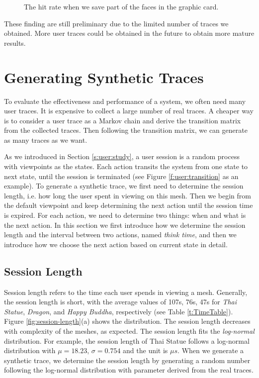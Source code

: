 \begin{figure}[htdp!]
    \centering
\caption{The hit rate when we save part of the faces in the graphic card.\label{fig:face_hit_rate}}
\end{figure}

These finding are still preliminary due to the limited number of traces we obtained. More user traces
could be obtained in the future to obtain more mature results.

\section{Generating Synthetic Traces}
\label{s:user:synthetic}
To evaluate the effectiveness and performance of a system, we often need many user traces. 
It is expensive to collect a large number of real traces. 
A cheaper way is to consider a user trace as a Markov chain
and derive the transition matrix from the collected traces.
Then following the transition matrix, we can generate as many traces as we want.

As we introduced in Section \ref{s:user:study}, a user session is a random process 
with viewpoints as the states. Each action transits
the system from one state to next state, until the session is terminated
(see Figure \ref{f:user:transition} as an example). 
To generate a synthetic trace, we first need to determine the session length, i.e. how long
the user spent in viewing on this mesh. Then we begin from the default viewpoint and keep
determining the next action until the session time is expired. For each action, we need 
to determine two things: when and what is the next action. In this section we first introduce
how we determine the session length and the interval between two actions, named \emph{think time},
and then we introduce how we choose the next action based on current state in detail.

\subsection{Session Length}
\label{ss:user:session}
Session length refers to the time each user spends in viewing a mesh. 
Generally, the session length is short, with the average values of 107s, 76s, 47s for \textit{Thai Statue}, 
\textit{Dragon}, and \textit{Happy Buddha}, respectively (see Table \ref{t:TimeTable}). 
Figure \ref{fig:session-length}(a) shows the distribution. 
The session length decreases with complexity of the meshes, as expected. 
The session length fits the \textit{log-normal} distribution.
For example, the session length of Thai Statue follows a log-normal
distribution with $\mu=18.23$, $\sigma = 0.754$ and the unit is ${\mu}s$.
When we generate a synthetic trace, we determine the session length by generating a random number following 
the log-normal distribution with parameter derived from the real traces.

